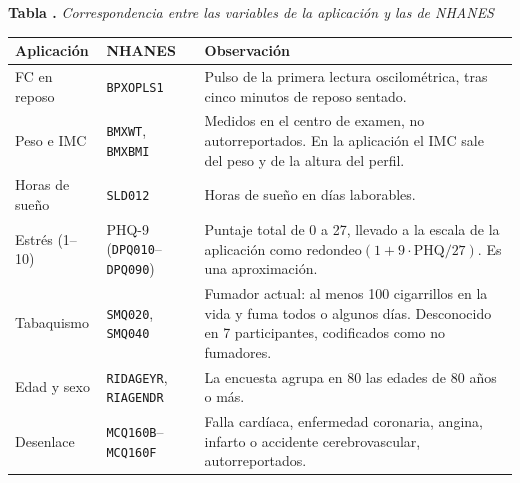\documentclass[12pt,letterpaper]{article}
\newcounter{tablaapa}
\newcommand{\tablaAPA}[2]{\refstepcounter{tablaapa}\label{#1}%
  \noindent\textbf{Tabla \thetablaapa.} \textit{#2}\par\vspace{0.2cm}}
\begin{document}
\begin{table}[!htbp]
\tablaAPA{tab:variables}{Correspondencia entre las variables de la aplicación y las de NHANES}
\small
\noindent\begin{tabularx}{\linewidth}{P{2.8cm}P{3.3cm}L}
\hline
\textbf{Aplicación} & \textbf{NHANES} & \textbf{Observación} \\
\hline
FC en reposo & \texttt{BPXOPLS1} & Pulso de la primera lectura oscilométrica, tras cinco minutos de reposo sentado. \\
Peso e IMC & \texttt{BMXWT}, \texttt{BMXBMI} & Medidos en el centro de examen, no autorreportados. En la aplicación el IMC sale del peso y de la altura del perfil. \\
Horas de sueño & \texttt{SLD012} & Horas de sueño en días laborables. \\
Estrés (1--10) & PHQ-9 (\texttt{DPQ010}--\texttt{DPQ090}) & Puntaje total de 0 a 27, llevado a la escala de la aplicación como $\mathrm{redondeo}(1+9\cdot\mathrm{PHQ}/27)$. Es una aproximación. \\
Tabaquismo & \texttt{SMQ020}, \texttt{SMQ040} & Fumador actual: al menos 100 cigarrillos en la vida y fuma todos o algunos días. Desconocido en 7 participantes, codificados como no fumadores. \\
Edad y sexo & \texttt{RIDAGEYR}, \texttt{RIAGENDR} & La encuesta agrupa en 80 las edades de 80 años o más. \\
Desenlace & \texttt{MCQ160B}--\texttt{MCQ160F} & Falla cardíaca, enfermedad coronaria, angina, infarto o accidente cerebrovascular, autorreportados. \\
\hline
\end{tabularx}
\end{table}
\end{document}
